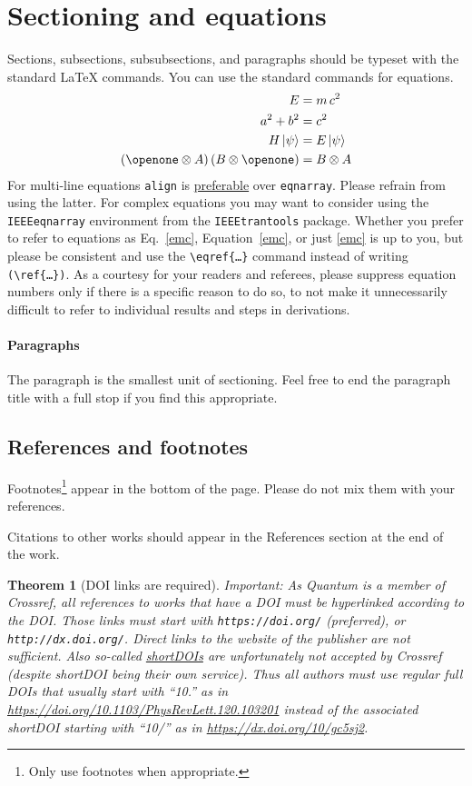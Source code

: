 \documentclass[a4paper,twocolumn,11pt]{quantumarticle}
\newtheorem{theorem}{Theorem}
\begin{document}
\section{Sectioning and equations}
Sections, subsections, subsubsections, and paragraphs should be typeset with the standard LaTeX commands.
You can use the standard commands for equations.
\begin{align}
  \label{emc}
  E &= m\,c^2\\
  a^2 + b^2 &= c^2\\
  H\,|\psi\rangle &= E\,|\psi\rangle\\
  (\openone \otimes A)\,(B \otimes \openone) &= B \otimes A
\end{align}
For multi-line equations \texttt{align} is \href{http://tex.stackexchange.com/questions/196/eqnarray-vs-align}{preferable} over \texttt{eqnarray}.
Please refrain from using the latter.
For complex equations you may want to consider using the \texttt{IEEEeqnarray} environment from the \texttt{IEEEtrantools} package.
Whether you prefer to refer to equations as Eq.~\eqref{emc}, Equation~\ref{emc}, or just \eqref{emc} is up to you, but please be consistent and use the \texttt{\textbackslash{}eqref\{\dots\}} command instead of writing \texttt{(\textbackslash{}ref\{\dots\})}.
As a courtesy for your readers and referees, please suppress equation numbers only if there is a specific reason to do so, to not make it unnecessarily difficult to refer to individual results and steps in derivations.

\paragraph{Paragraphs}
The paragraph is the smallest unit of sectioning.
Feel free to end the paragraph title with a full stop if you find this appropriate.

\subsection{References and footnotes}
\label{sec:subsec1}
Footnotes\footnote{Only use footnotes when appropriate.} appear in the bottom of the page.
Please do not mix them with your references.

Citations to other works should appear in the References section at the end of the work.

\begin{theorem}[DOI links are required]
  Important: As Quantum is a member of Crossref, all references to works that have a DOI must be hyperlinked according to the DOI. Those links must start with \texttt{https://doi.org/} (preferred), or \texttt{http://dx.doi.org/}. Direct links to the website of the publisher are not sufficient. Also so-called \href{https://shortdoi.org/}{shortDOIs} are unfortunately not accepted by Crossref (despite shortDOI being their own service). Thus all authors must use regular full DOIs that usually start with \mbox{``10.''} as in \url{https://doi.org/10.1103/PhysRevLett.120.103201} instead of the associated shortDOI starting with \mbox{``10/''} as in \url{https://dx.doi.org/10/gc5sj2}.
\end{theorem}
\end{document}
